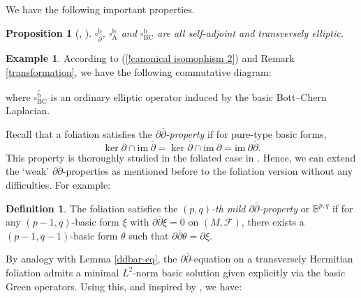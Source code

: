 \documentclass[12pt]{amsart}
\numberwithin{equation}{section}
\newtheorem{proposition}[theorem]{Proposition}
\theoremstyle{definition}
\newtheorem{example}  [theorem]     {Example}
\theoremstyle{definition}
\newtheorem{definition}  [theorem]     {Definition}
\theoremstyle{definition}
\renewcommand{\1}{\mathsf{1}}
\renewcommand{\>}{\rightarrow}
\newcommand{\p}{\partial}
\newcommand{\bp}{\overline\partial}
\def\p{\partial}
\def\b{\bar}
\def\mc{\mathcal}
\theoremstyle{plain} %
\theoremstyle{plain} %
\theoremstyle{plain} %
\begin{document}
	We have the following important properties.
	\begin{proposition}[{\cite[Proposition  6.2]{EKAG97}, \cite[Proposition 3.1]{Ra17}}]
		
		$\square ^\mathrm b_{\bp}$, $\square^\mathrm b_{\mathrm{A}}$ and $\square^\mathrm b_{\mathrm {BC}}$ are all self-adjoint and transversely elliptic.
	\end{proposition}
	\begin{example}
		According to (\ref{!canonical isomophism 2}) and Remark \ref{transformation}, we have the following commutative diagram:
		
		
		where $\widetilde{\square^\mathrm b_{\mathrm {BC}}}$ is an ordinary elliptic operator induced by the basic Bott--Chern Laplacian.
	\end{example}
	
	
	
	Recall that a foliation satisfies the \emph{$\p\bp$-property} if  for pure-type basic forms,
	\begin{equation}\label{foliation ddbar}
		\ker \partial \cap\textrm{im}\ \bp=\ker \bp \cap\textrm{im}\  \p =\textrm{im}\ \p\bp.
	\end{equation}
	This property is thoroughly studied in the foliated case in \cite{Ra17,Ra21}. Hence, we can  extend the `weak' $\partial\bp$-properties as mentioned before to the  foliation version  without any difficulties.  For example:
	
	\begin{definition}\label{MILD}
		The foliation satisfies the \textit{$(p,q)$-th mild $\p\b{\p}$-property} or \textit{$\mathbb B^{p,q}$} if for any  $(p-1,q)$-basic form $\xi$ with $\p\b{\p}\xi=0$ on $(M,\mc F)$, there exists a $(p-1,q-1)$-basic form $\theta$ such that $\p\b{\p} \theta=\p\xi$.
	\end{definition}
	
	
By analogy with Lemma \ref{ddbar-eq}, the $\partial \bar{\partial}$-equation on a transversely Hermitian foliation admits a minimal $L^2$-norm basic solution given explicitly via the basic Green operators. Using this, and inspired by \cite[Observation 2.11]{RWZ21}, we have:
\end{document}
